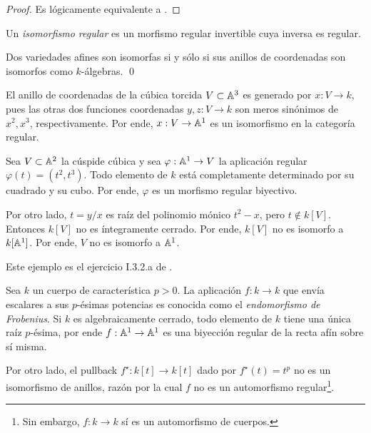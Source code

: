 \begin{proof}
Es lógicamente equivalente a \cite[p. 38]{fulton}.
\end{proof}

\begin{definition}
Un \textit{isomorfismo regular} es un morfismo regular invertible cuya inversa es regular.
\end{definition}

\begin{corollary}
Dos variedades afines son isomorfas si y sólo si sus anillos de coordenadas son isomorfos como $k$-álgebras. \qed
\end{corollary}

\begin{example}
El anillo de coordenadas de la cúbica torcida $V \subset \mathbb A^3$ es generado por $x : V \to k$, pues las otras dos funciones coordenadas $y, z : V \to k$ son meros sinónimos de $x^2, x^3$, respectivamente. Por ende, $x : V \to \mathbb A^1$ es un isomorfismo en la categoría regular.
\end{example}

\begin{example}
Sea $V \subset \mathbb A^2$ la cúspide cúbica y sea $\varphi : \mathbb A^1 \to V$ la aplicación regular $\varphi(t) = (t^2, t^3)$. Todo elemento de $k$ está completamente determinado por su cuadrado y su cubo. Por ende, $\varphi$ es un morfismo regular biyectivo.

Por otro lado, $t = y/x$ es raíz del polinomio mónico $t^2 - x$, pero $t \notin k[V]$. Entonces $k[V]$ no es íntegramente cerrado. Por ende, $k[V]$ no es isomorfo a $k[\mathbb A^1]$. Por ende, $V$ no es isomorfo a $\mathbb A^1$.
\end{example}

\begin{remark}
Este ejemplo es el ejercicio I.3.2.a de \cite[p. 21]{hartshorne}.
\end{remark}

\begin{example}
Sea $k$ un cuerpo de característica $p > 0$. La aplicación $f : k \to k$ que envía escalares a sus $p$-ésimas potencias es conocida como el \textit{endomorfismo de Frobenius}. Si $k$ es algebraicamente cerrado, todo elemento de $k$ tiene una única raíz $p$-ésima, por ende $f : \mathbb A^1 \to \mathbb A^1 $ es una biyección regular de la recta afín sobre sí misma.

Por otro lado, el pullback $f^\star : k[t] \to k[t]$ dado por $f^\star(t) = t^p$ no es un isomorfismo de anillos, razón por la cual $f$ no es un automorfismo regular\footnote{Sin embargo, $f : k \to k$ sí es un automorfismo de cuerpos.}.
\end{example}

